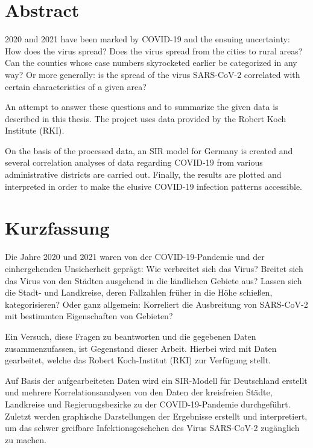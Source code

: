 \chapter*{Abstract}
2020 and 2021 have been marked by COVID-19 and the ensuing uncertainty:
How does the virus spread? Does the virus spread from the cities to rural areas? Can the counties whose case numbers skyrocketed earlier be categorized in any way? Or more generally: is the spread of the virus SARS-CoV-2 correlated with certain characteristics of a given area?

An attempt to answer these questions and to summarize the given data is described in this thesis. The project uses data provided by the Robert Koch Institute (RKI).

On the basis of the processed data, an SIR model for Germany is created and several correlation analyses of data regarding COVID-19 from various administrative districts are carried out.
Finally, the results are plotted and interpreted in order to make the elusive COVID-19 infection patterns accessible.

\chapter*{Kurzfassung}
Die Jahre 2020 und 2021 waren von der COVID-19-Pandemie und der einhergehenden Unsicherheit geprägt:
Wie verbreitet sich das Virus? Breitet sich das Virus von den Städten ausgehend in die ländlichen Gebiete aus? Lassen sich die Stadt- und Landkreise, deren Fallzahlen früher in die Höhe schießen, kategorisieren? Oder ganz allgemein: Korreliert die Ausbreitung von SARS-CoV-2 mit bestimmten Eigenschaften von Gebieten?

Ein Versuch, diese Fragen zu beantworten und die gegebenen Daten zusammenzufassen, ist Gegenstand dieser Arbeit. Hierbei wird mit Daten gearbeitet, welche das Robert Koch-Institut (RKI) zur Verfügung stellt.

Auf Basis der aufgearbeiteten Daten wird ein SIR-Modell für Deutschland erstellt und mehrere Korrelationsanalysen von den Daten der kreisfreien Städte, Landkreise und Regierungsbezirke zu der COVID-19-Pandemie durchgeführt.
Zuletzt werden graphische Darstellungen der Ergebnisse erstellt und interpretiert, um das schwer greifbare Infektionsgeschehen des Virus SARS-CoV-2 zugänglich zu machen.
\newpage